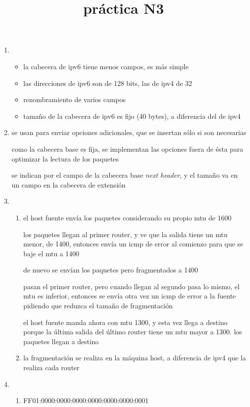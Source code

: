 \documentclass[11pt]{article}
\date{}
\title{práctica N3}
\begin{document}
\maketitle
\begin{enumerate}
\item \begin{itemize}
\item la cabecera de ipv6 tiene menos campos, es más simple
\item las direcciones de ipv6 son de 128 bits, las de ipv4 de 32
\item renombramiento de varios campos
\item tamaño de la cabecera de ipv6 es fijo (40 bytes), a diferencia del de ipv4
\end{itemize}
\item se usan para enviar opciones adicionales, que se insertan sólo si son necesarias

como la cabecera base es fija, se implementan las opciones fuera de ésta para optimizar la lectura de los paquetes

se indican por el campo de la cabecera base \emph{next header}, y el tamaño va en un campo en la cabecera de extensión
\item \begin{enumerate}
\item el host fuente envía los paquetes considerando su propio mtu de 1600

los paquetes llegan al primer router, y ve que la salida tiene un mtu menor, de 1400, entonces envía un icmp de error al comienzo para que se baje el mtu a 1400

de nuevo se envían los paquetes pero fragmentados a 1400

pasan el primer router, pero cuando llegan al segundo pasa lo mismo, el mtu es inferior, entonces se envía otra vez un icmp de error a la fuente pidiendo que reduzca el tamaño de fragmentación

el host fuente manda ahora con mtu 1300, y esta vez llega a destino porque la última salida del último router tiene un mtu mayor a 1300. los paquetes llegan a destino
\item la fragmentación se realiza en la máquina host, a diferencia de ipv4 que la realiza cada router
\end{enumerate}
\item \begin{enumerate}
\item FF01:0000:0000:0000:0000:0000:0000:0001


\end{enumerate}
\end{enumerate}
\end{document}
